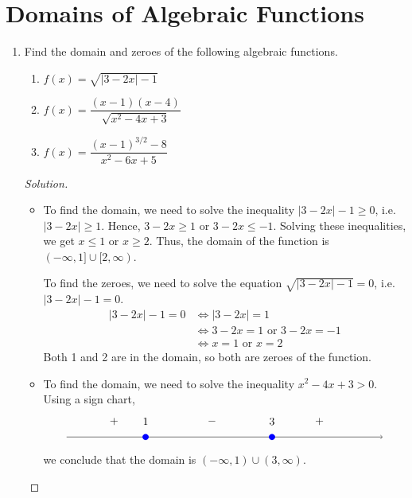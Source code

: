 \documentclass[12pt]{article}
\newenvironment{solution}{\begin{proof}[Solution]}{\end{proof}}
\begin{document}
			\newpage
			
				\section{Domains of Algebraic Functions}
			\begin{enumerate}
				\item Find the domain and zeroes of the following algebraic functions.
				
				\begin{enumerate}
					\item $f(x)=\sqrt{|3-2x|-1}$
					
					\item $f(x)=\dfrac{(x-1)(x-4)}{\sqrt{x^2-4x+3}}$
				
					\item $f(x)=\dfrac{(x-1)^{3/2}-8}{x^2-6x+5}$
					
				\end{enumerate}
				
				\begin{solution}
					\begin{itemize}
						\item[(a)] 	To find the domain, we need to solve the inequality $|3-2x|-1\geq 0$, i.e. $|3-2x|\geq 1$. Hence, $3-2x\geq1$ or $3-2x\leq-1$. Solving these inequalities, we get $x\leq1$ or $x\geq2$. Thus, the domain of the function is $(-\infty,1]\cup[2,\infty)$.
						
						To find the zeroes, we need to solve the equation $\sqrt{|3-2x|-1}=0$, i.e. $|3-2x|-1=0$. 
						\begin{align*}
							|3-2x|-1=0 &\iff |3-2x|=1\\
							&\iff 3-2x=1 \text{ or } 3-2x=-1\\
							&\iff x=1 \text{ or } x=2
						\end{align*}
						Both 1 and 2 are in the domain, so both are zeroes of the function.
						\item[(b)] To find the domain, we need to solve the inequality $x^2-4x+3>0$. Using a sign chart,
						\[
						\begin{tikzpicture}[scale=1]
							\draw[->] (-5,0) -- (5,0);
							
							\draw (-2.5,0) node[circle,blue,fill,inner sep=2pt]{};
							\draw (1.5,0) node[circle,blue,fill,inner sep=2pt]{};
							
							\node at (-2.5, .5) {1};
							\node at (1.5, .5) {3};
							\node at (-3.5,.5) {$+$};
							\node at (-0.4,.5) {$-$};
							\node at (3, .5) {$+$};
						\end{tikzpicture}
						\]
						we conclude that the domain is $(-\infty,1)\cup(3,\infty)$.
						

\end{itemize}
\end{solution}
\end{enumerate}
\end{document}
